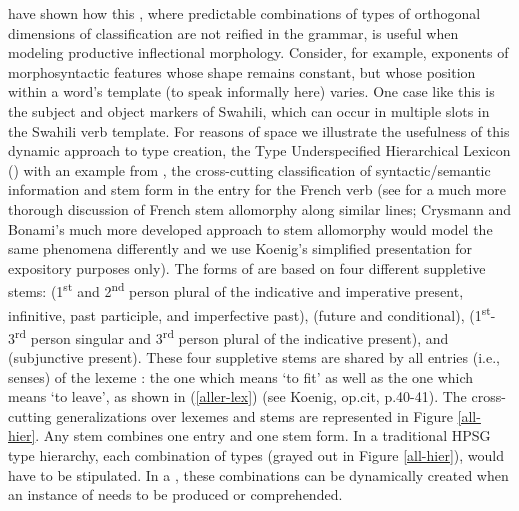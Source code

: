 \documentclass[output=paper]{langsci/langscibook}
\begin{document}
\citet{CrysmannandBonami2016} have shown how this , where predictable combinations of types of orthogonal dimensions of classification are not reified in the grammar, is useful when modeling productive inflectional morphology. Consider, for example, exponents of morphosyntactic features whose shape remains constant, but whose position within a word's template (to speak informally here) varies. One case like this is the subject and object markers of Swahili, which can occur in multiple slots in the Swahili verb template. For reasons of space we illustrate the usefulness of this dynamic approach to type creation, the Type Underspecified Hierarchical Lexicon () with an example from \citet{Koenig99a}, the cross-cutting classification of syntactic/semantic information and stem form in the entry for the French verb  (see \citet{BonamiandBoye2001} for a much more thorough discussion of French stem allomorphy along similar lines; Crysmann and Bonami's much more developed approach to stem allomorphy would model the same phenomena differently and we use Koenig's simplified presentation for expository purposes only). The forms of  are based on four different suppletive stems:  (1\textsuperscript{st} and 2\textsuperscript{nd} person plural of the indicative and imperative present, infinitive, past participle, and imperfective past),  (future and conditional),  (1\textsuperscript{st}-3\textsuperscript{rd} person singular and 3\textsuperscript{rd} person plural of the indicative present), and  (subjunctive present). These four suppletive stems are shared by all entries (i.e., senses) of the lexeme : the one which means `to fit' as well as the one which means `to leave', as shown in (\ref{aller-lex}) (see Koenig, op.cit, p.40-41). The cross-cutting generalizations over lexemes and stems are represented in Figure \ref{all-hier}. Any  stem combines one entry and one stem form. In a traditional HPSG type hierarchy, each combination of types (grayed out in Figure \ref{all-hier}), would have to be stipulated. In a , these combinations can be dynamically created when an instance of  needs to be produced or comprehended.
\end{document}
